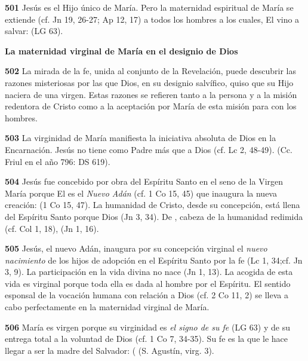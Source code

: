 \textbf{501} Jesús es el Hijo único de María. Pero la maternidad espiritual de María se extiende (cf. Jn 19, 26-27; Ap 12, 17) a todos los hombres a los cuales, El vino a salvar:  (LG 63).

\textbf{La maternidad virginal de María en el designio de Dios}

\textbf{502} La mirada de la fe, unida al conjunto de la Revelación, puede descubrir las razones misteriosas por las que Dios, en su designio salvífico, quiso que su Hijo naciera de una virgen. Estas razones se refieren tanto a la persona y a la misión redentora de Cristo como a la aceptación por María de esta misión para con los hombres.

\textbf{503} La virginidad de María manifiesta la iniciativa absoluta de Dios en la Encarnación. Jesús no tiene como Padre más que a Dios (cf. Lc 2, 48-49).  (Cc. Friul en el año 796: DS 619).

\textbf{504} Jesús fue concebido por obra del Espíritu Santo en el seno de la Virgen María porque El es el \emph{Nuevo Adán} (cf. 1 Co 15, 45) que inaugura la nueva creación:  (1 Co 15, 47). La humanidad de Cristo, desde su concepción, está llena del Espíritu Santo porque Dios  (Jn 3, 34). De , cabeza de la humanidad redimida (cf. Col 1, 18),  (Jn 1, 16).

\textbf{505} Jesús, el nuevo Adán, inaugura por su concepción virginal el \emph{nuevo nacimiento} de los hijos de adopción en el Espíritu Santo por la fe  (Lc 1, 34;cf. Jn 3, 9). La participación en la vida divina no nace  (Jn 1, 13). La acogida de esta vida es virginal porque toda ella es dada al hombre por el Espíritu. El sentido esponsal de la vocación humana con relación a Dios (cf. 2 Co 11, 2) se lleva a cabo perfectamente en la maternidad virginal de María.

\textbf{506} María es virgen porque su virginidad es \emph{el signo de su fe}  (LG 63) y de su entrega total a la voluntad de Dios (cf. 1 Co 7, 34-35). Su fe es la que le hace llegar a ser la madre del Salvador:  ( (S. Agustín, virg. 3).

